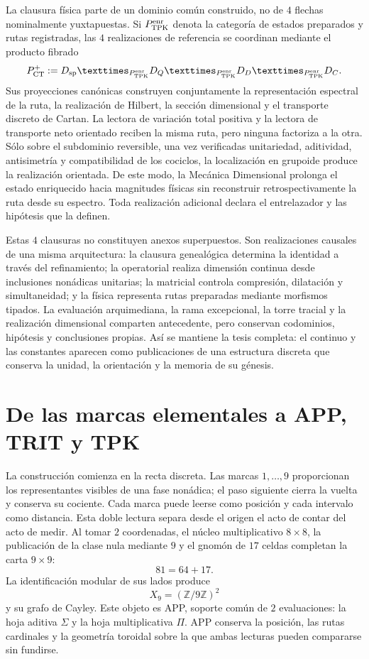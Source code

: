 La clausura física parte de un dominio común construido, no de \(4\) flechas
nominalmente yuxtapuestas. Si \(\mathsf P_{\rm TPK}^{\rm enr}\) denota la
categoría de estados preparados y rutas registradas, las \(4\) realizaciones
de referencia se coordinan mediante el producto fibrado
\[
 \mathsf P_{\rm CT}^{+}
 :=\mathsf D_{\rm sp}
 \times_{\mathsf P_{\rm TPK}^{\rm enr}}\mathsf D_Q
 \times_{\mathsf P_{\rm TPK}^{\rm enr}}\mathsf D_D
 \times_{\mathsf P_{\rm TPK}^{\rm enr}}\mathsf D_C.
\]
Sus proyecciones canónicas construyen conjuntamente la representación
espectral de la ruta, la realización de Hilbert, la sección dimensional y el
transporte discreto de Cartan. La lectora de variación total positiva y la
lectora de transporte neto orientado reciben la misma ruta, pero ninguna
factoriza a la otra. Sólo sobre el subdominio reversible, una vez verificadas
unitariedad, aditividad, antisimetría y compatibilidad de los cociclos, la
localización en grupoide produce la realización orientada. De este modo, la
Mecánica Dimensional prolonga el estado enriquecido hacia magnitudes físicas
sin reconstruir retrospectivamente la ruta desde su espectro. Toda
realización adicional declara el entrelazador y las hipótesis que la definen.

Estas \(4\) clausuras no constituyen anexos superpuestos. Son realizaciones
causales de una misma arquitectura: la clausura genealógica determina la
identidad a través del refinamiento; la operatorial realiza dimensión continua
desde inclusiones nonádicas unitarias; la matricial controla compresión,
dilatación y simultaneidad; y la física representa rutas preparadas mediante
morfismos tipados. La evaluación arquimediana, la rama excepcional, la torre
tracial y la realización dimensional comparten antecedente, pero conservan
codominios, hipótesis y conclusiones propias. Así se mantiene la tesis
completa: el continuo y las constantes aparecen como publicaciones de una
estructura discreta que conserva la unidad, la orientación y la memoria de su
génesis.

\section*{De las marcas elementales a APP, TRIT y TPK}

La construcción comienza en la recta discreta. Las marcas
\(1,\ldots,9\) proporcionan los representantes visibles de una fase
nonádica; el paso siguiente cierra la vuelta y conserva su cociente. Cada
marca puede leerse como posición y cada intervalo como distancia. Esta doble
lectura separa desde el origen el acto de contar del acto de medir. Al tomar
\(2\) coordenadas, el núcleo multiplicativo \(8\times8\), la publicación de la
clase nula mediante \(9\) y el gnomón de \(17\) celdas completan la carta
\(9\times9\):
\[
 81=64+17.
\]
La identificación modular de sus lados produce
\[
 X_9=(\mathbb Z/9\mathbb Z)^2
\]
y su grafo de Cayley. Este objeto es APP, soporte común de \(2\) evaluaciones:
la hoja aditiva \(\Sigma\) y la hoja multiplicativa \(\Pi\). APP conserva la
posición, las rutas cardinales y la geometría toroidal sobre la que ambas
lecturas pueden compararse sin fundirse.

